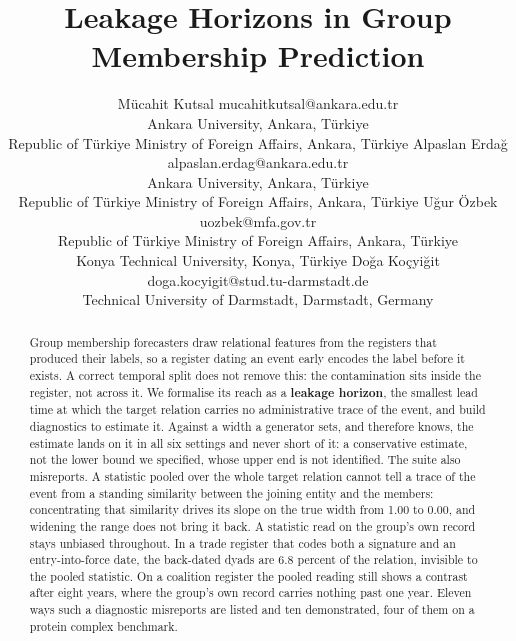 \documentclass[twoside,11pt]{article}
\begin{document}
\title{Leakage Horizons in Group Membership Prediction}

\author{\name M\"ucahit Kutsal \email mucahitkutsal@ankara.edu.tr \\
       \addr Ankara University, Ankara, T\"urkiye \\
       Republic of T\"urkiye Ministry of Foreign Affairs, Ankara, T\"urkiye
       \AND
       \name Alpaslan Erda\u{g} \email alpaslan.erdag@ankara.edu.tr \\
       \addr Ankara University, Ankara, T\"urkiye \\
       Republic of T\"urkiye Ministry of Foreign Affairs, Ankara, T\"urkiye
       \AND
       \name U\u{g}ur \"Ozbek \email uozbek@mfa.gov.tr \\
       \addr Republic of T\"urkiye Ministry of Foreign Affairs, Ankara, T\"urkiye \\
       Konya Technical University, Konya, T\"urkiye
       \AND
       \name Do\u{g}a Ko\c{c}yi\u{g}it \email doga.kocyigit@stud.tu-darmstadt.de \\
       \addr Technical University of Darmstadt, Darmstadt, Germany}

\editor{}

\maketitle

\begin{abstract}%
Group membership forecasters draw relational features from the registers that produced their labels, so a register dating an event early encodes the label before it exists. A correct temporal split does not remove this: the contamination sits inside the register, not across it. We formalise its reach as a \textbf{leakage horizon}, the smallest lead time at which the target relation carries no administrative trace of the event, and build diagnostics to estimate it. Against a width a generator sets, and therefore knows, the estimate lands on it in all six settings and never short of it: a conservative estimate, not the lower bound we specified, whose upper end is not identified. The suite also misreports. A statistic pooled over the whole target relation cannot tell a trace of the event from a standing similarity between the joining entity and the members: concentrating that similarity drives its slope on the true width from 1.00 to 0.00, and widening the range does not bring it back. A statistic read on the group's own record stays unbiased throughout. In a trade register that codes both a signature and an entry-into-force date, the back-dated dyads are 6.8 percent of the relation, invisible to the pooled statistic. On a coalition register the pooled reading still shows a contrast after eight years, where the group's own record carries nothing past one year. Eleven ways such a diagnostic misreports are listed and ten demonstrated, four of them on a protein complex benchmark.
\end{abstract}
\end{document}
